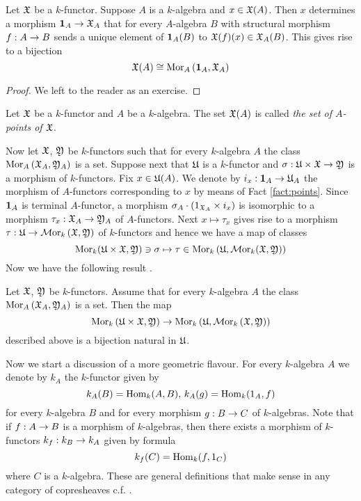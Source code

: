 \begin{fact}\label{fact:points}
Let ${\mathfrak X}$ be a $k$-functor. Suppose $A$ is a $k$-algebra and $x\in {\mathfrak X}(A)$. Then $x$ determines a morphism $\mathbf{1}_{A}\rightarrow {\mathfrak X}_A$ that for every $A$-algebra $B$ with structural morphism $f:A\rightarrow B$ sends a unique element of $\mathbf{1}_{A}(B)$ to ${\mathfrak X}(f)(x)\in {\mathfrak X}_A(B)$. This gives rise to a bijection
$${\mathfrak X}(A)\cong \mathrm{Mor}_{A}\left(\mathbf{1}_{A},{\mathfrak X}_A\right)$$
\end{fact}
\begin{proof}
We left to the reader as an exercise.
\end{proof}

\begin{definition}
Let ${\mathfrak X}$ be a $k$-functor and $A$ be a $k$-algebra. The set ${\mathfrak X}(A)$ is called \textit{the set of $A$-points of ${\mathfrak X}$}.
\end{definition}
\noindent
Now let ${\mathfrak X}$, ${\mathfrak Y}$ be $k$-functors such that for every $k$-algebra $A$ the class $\mathrm{Mor}_A\left({\mathfrak X}_A,{\mathfrak Y}_A\right)$ is a set. Suppose next that ${\mathfrak U}$ is a $k$-functor and $\sigma:{\mathfrak U}\times {\mathfrak X}\rightarrow {\mathfrak Y}$ is a morphism of $k$-functors. Fix $x\in {\mathfrak U}(A)$. We denote by $i_x:\mathbf{1}_A\rightarrow {\mathfrak U}_A$ the morphism of $A$-functors corresponding to $x$ by means of Fact \ref{fact:points}. Since $\mathbf{1}_A$ is terminal $A$-functor, a morphism $\sigma_A\cdot \left(1_{{\mathfrak X}_A}\times i_x\right)$ is isomorphic to a morphism $\tau_x:{\mathfrak X}_A\rightarrow {\mathfrak Y}_A$ of $A$-functors. Next $x\mapsto \tau_x$ gives rise to a morphism $\tau:{\mathfrak U}\rightarrow \mathcal{M}\mathrm{or}_k\left({\mathfrak X},{\mathfrak Y}\right)$ of $k$-functors and hence we have a map of classes
$$\mathrm{Mor}_k({\mathfrak U}\times {\mathfrak X},{\mathfrak Y})\ni \sigma\mapsto \tau\in \mathrm{Mor}_k\left({\mathfrak U},\mathcal{M}\mathrm{or}_k({\mathfrak X},{\mathfrak Y})\right)$$
Now we have the following result {\cite[Theorem 5.3]{Presheaves}}.

\begin{theorem}\label{theorem:homforkfunctors}
Let ${\mathfrak X}$, ${\mathfrak Y}$ be $k$-functors. Assume that for every $k$-algebra $A$ the class $\mathrm{Mor}_{A}\left({\mathfrak X}_A,{\mathfrak Y}_A\right)$ is a set. Then the map 
$$\mathrm{Mor}_{k}\left({\mathfrak U}\times {\mathfrak X},{\mathfrak Y}\right)\rightarrow  \mathrm{Mor}_{k}\left({\mathfrak U},\mathcal{M}\mathrm{or}_{k}\left({\mathfrak X},{\mathfrak Y}\right)\right)$$
described above is a bijection natural in ${\mathfrak U}$. 
\end{theorem}
\noindent
Now we start a discussion of a more geometric flavour. For every $k$-algebra $A$ we denote by $k_A$ the $k$-functor given by
$$k_A(B) = \mathrm{Hom}_k(A,B),\,k_A(g) = \mathrm{Hom}_k(1_A,f)$$
for every $k$-algebra $B$ and for every morphism $g:B\rightarrow C$ of $k$-algebras. Note that if $f:A\rightarrow B$ is a morphism of $k$-algebras, then there exists a morphism of $k$-functors $k_f:k_B\rightarrow k_A$ given by formula
$$k_f(C) = \mathrm{Hom}_k(f,1_C)$$
where $C$ is a $k$-algebra. These are general definitions that make sense in any category of copresheaves c.f. {\cite[section 7]{Presheaves}}.

